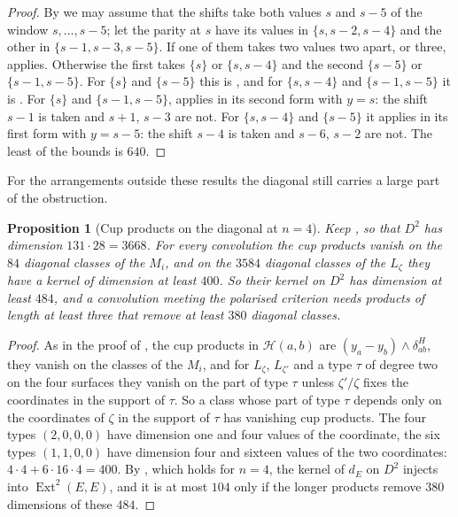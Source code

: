 \documentclass[11pt,reqno]{amsart}
\theoremstyle{plain}
\newtheorem{proposition}[theorem]{Proposition}
\theoremstyle{definition}
\theoremstyle{remark}
\newcommand{\cH}{\mathcal{H}}
\DeclareMathOperator{\Ext}{Ext}
\begin{document}
\begin{proof}
By  we may assume that the shifts take both values $s$
and $s-5$ of the window $s,\dots,s-5$; let the parity at $s$ have its values
in $\{s,s-2,s-4\}$ and the other in $\{s-1,s-3,s-5\}$. If one of them takes
two values two apart, or three,  applies.
Otherwise the first takes $\{s\}$ or $\{s,s-4\}$ and the second $\{s-5\}$ or
$\{s-1,s-5\}$. For $\{s\}$ and $\{s-5\}$ this is ,
and for $\{s,s-4\}$ and $\{s-1,s-5\}$ it is . For
$\{s\}$ and $\{s-1,s-5\}$,  applies in its second form
with $y=s$: the shift $s-1$ is taken and $s+1$, $s-3$ are not. For
$\{s,s-4\}$ and $\{s-5\}$ it applies in its first form with $y=s-5$: the
shift $s-4$ is taken and $s-6$, $s-2$ are not. The least of the bounds is
$640$.
\end{proof}

For the arrangements outside these results the diagonal still carries a
large part of the obstruction.

\begin{proposition}[Cup products on the diagonal at $n=4$]
\label{prop:efourcupkernel}
Keep , so that $D^{2}$ has dimension $131\cdot28=3668$.
For every convolution the cup products vanish on the $84$ diagonal classes of
the $M_{i}$, and on the $3584$ diagonal classes of the $L_{\zeta}$ they have
a kernel of dimension at least $400$. So their kernel on $D^{2}$ has
dimension at least $484$, and a convolution meeting the polarised criterion
needs products of length at least three that remove at least $380$ diagonal
classes.
\end{proposition}

\begin{proof}
As in the proof of , the cup products in $\cH(a,b)$
are $(y_{a}-y_{b})\wedge\delta^{H}_{ab}$, they vanish on the classes of the
$M_{i}$, and for $L_{\zeta}$, $L_{\zeta'}$ and a type $\tau$ of degree two on
the four surfaces they vanish on the part of type $\tau$ unless $\zeta'/\zeta$
fixes the coordinates in the support of $\tau$. So a class whose part of type
$\tau$ depends only on the coordinates of $\zeta$ in the support of $\tau$
has vanishing cup products. The four types $(2,0,0,0)$ have dimension one and
four values of the coordinate, the six types $(1,1,0,0)$ have dimension four
and sixteen values of the two coordinates: $4\cdot4+6\cdot16\cdot4=400$. By
, which holds for $n=4$, the kernel of $d_{E}$ on
$D^{2}$ injects into $\Ext^{2}(E,E)$, and it is at most $104$ only if the
longer products remove $380$ dimensions of these $484$.
\end{proof}
\end{document}
